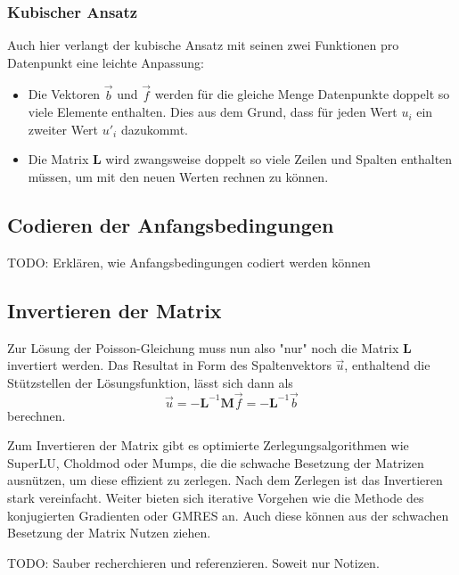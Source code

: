 \subsubsection{Kubischer Ansatz}
Auch hier verlangt der kubische Ansatz mit seinen zwei Funktionen pro Datenpunkt eine leichte Anpassung: 
\begin{itemize}
    \item Die Vektoren $\vec{b}$ und $\vec{f}$ werden für die gleiche Menge Datenpunkte doppelt so viele Elemente enthalten.
          Dies aus dem Grund, dass für jeden Wert $u_i$ ein zweiter Wert $u'_i$ dazukommt.
    \item Die Matrix $\mathbf{L}$ wird zwangsweise doppelt so viele Zeilen und Spalten enthalten müssen, um mit den neuen Werten rechnen zu können. %
\end{itemize}


\subsection{Codieren der Anfangsbedingungen\label{fem:1d:anfangsbedingungen}}
TODO: Erklären, wie Anfangsbedingungen codiert werden können


\subsection{Invertieren der Matrix\label{fem:1d:matrix_invertieren}}
Zur Lösung der Poisson-Gleichung muss nun also "nur" noch die Matrix $\mathbf{L}$ invertiert werden.
Das Resultat in Form des Spaltenvektors $\vec{u}$, enthaltend die Stützstellen der Lösungsfunktion, lässt sich dann als
\begin{equation}
    \vec{u} = - \mathbf{L}^{-1}\mathbf{M}\vec{f} = - \mathbf{L}^{-1}\vec{b}
\end{equation}
berechnen.

Zum Invertieren der Matrix gibt es optimierte Zerlegungsalgorithmen wie SuperLU, Choldmod oder Mumps, die die schwache Besetzung der Matrizen ausnützen, um diese effizient zu zerlegen. %
Nach dem Zerlegen ist das Invertieren stark vereinfacht.
Weiter bieten sich iterative Vorgehen wie die Methode des konjugierten Gradienten oder GMRES an.
Auch diese können aus der schwachen Besetzung der Matrix Nutzen ziehen.

TODO: Sauber recherchieren und referenzieren. Soweit nur Notizen.
